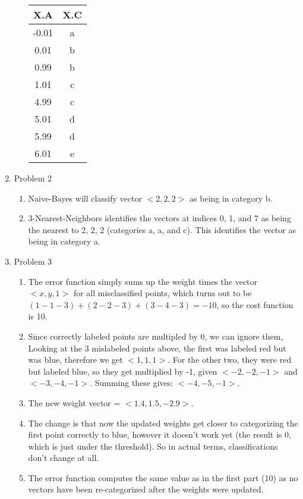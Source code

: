 \documentclass{article}
\begin{document}
\begin{enumerate}
\begin{enumerate}
			\begin{center}
				\begin{tabular}{|c|c|}
					\hline
					X.A & X.C\\
					\hline
					-0.01 & a\\
					\hline
					0.01 & b\\
					\hline
					0.99 & b \\
					\hline
					1.01 & c\\
					\hline
					4.99 & c\\
					\hline
					5.01 & d\\
					\hline
					5.99 & d \\
					\hline
					6.01 & e\\
					\hline
				\end{tabular}
			\end{center}
		\end{enumerate}
	
	\item Problem 2
	
	\begin{enumerate}
		\item Naive-Bayes will classify vector $<2, 2, 2>$ as being in category b.
		
		\item 3-Nearest-Neighbors identifies the vectors at indices 0, 1, and 7 as being the nearest to 2, 2, 2 (categories a, a, and c).  This identifies the vector as being in category a.
	\end{enumerate}

	\item Problem 3
	
	\begin{enumerate}
		\item The error function simply sums up the weight times the vector $<x, y, 1>$ for all misclassified points, which turns out to be $(1 - 1 - 3) + (2 - 2 - 3) + (3 - 4 - 3) = -10$, so the cost function is 10.
		
		\item Since correctly labeled points are multipled by 0, we can ignore them,  Looking at the 3 mislabeled points above, the first was labeled red but was blue, therefore we get $<1, 1, 1>$.  For the other two, they were red but labeled blue, so they get multiplied by -1, given $<-2, -2, -1>$ and $<-3, -4, -1>$.  Summing these gives: $<-4, -5, -1>$.
		
		\item The new weight vector = $<1.4, 1.5, -2.9>$.
		
		\item The change is that now the updated weights get closer to categorizing the first point correctly to blue, however it doesn't work yet (the result is 0, which is just under the threshold).  So in actual terms, classifications don't change at all.
		
		\item The error function computes the same value as in the first part (10) as no vectors have been re-categorized after the weights were updated.
	\end{enumerate}
	
	\end{enumerate}
\end{document}
